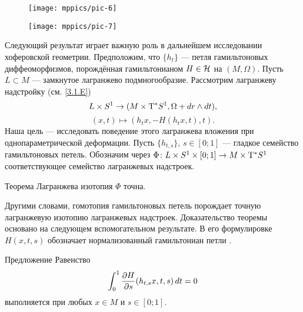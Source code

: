 \begin{figure}[ht!]
\begin{minipage}{.48\textwidth}
\centering
\texttt{[image: mppics/pic-6]}
\end{minipage}\hfill
\begin{minipage}{.48\textwidth}
\centering
\texttt{[image: mppics/pic-7]}
\end{minipage}

\medskip

\begin{minipage}{.48\textwidth}
\centering
\caption{}\label{pic-6}
\end{minipage}\hfill
\begin{minipage}{.48\textwidth}
\centering
\caption{}\label{pic-7}
\end{minipage}
\vskip-4mm
\end{figure}

Следующий результат играет важную роль в дальнейшем исследовании хоферовской геометрии.
Предположим, что $\{h_t\}$ — петля гамильтоновых диффеоморфизмов, порождённая гамильтонианом $H \in \mathcal{H}$ на $(M, \Omega)$.
Пусть $L \subset M$ — замкнутое лагранжево подмногообразие.
Рассмотрим лагранжеву надстройку (см. \ref{3.1.E})
\[L \times S^1 \to (M \times \mathrm{T}^\ast S^1, \Omega + d r \wedge d t),\]
\[(x, t) \mapsto (h_t x, -H (h_t x, t), t).\]
Наша цель — исследовать поведение этого лагранжева вложения при однопараметрической деформации.
Пусть $\{h_{t, s}\}$, $s \in [0; 1]$ — гладкое семейство гамильтоновых петель.
Обозначим через $\Phi\: L \z\times S^1 \z\times [0; 1] \z\to M \z\times \T^\ast S^1$ соответствующее семейство лагранжевых надстроек.

\begin{thm}{Теорема}\label{6.1.B}
Лагранжева изотопия $\Phi$ точна.
\end{thm}

Другими словами, гомотопия гамильтоновых петель порождает точную
лагранжевую изотопию лагранжевых надстроек. 
Доказательство теоремы основано на следующем вспомогательном результате.
В его формулировке $H (x, t, s)$ обозначает нормализованный
гамильтониан петли . 

\begin{thm}{Предложение}\label{6.1.C}
Равенство 
\[\int_0^1 \frac{\partial H}{\partial s} (h_{t, s} x, t, s)\,d t = 0\]
выполняется при любых $x \in M$ и $s \in [0; 1]$.
\end{thm}


